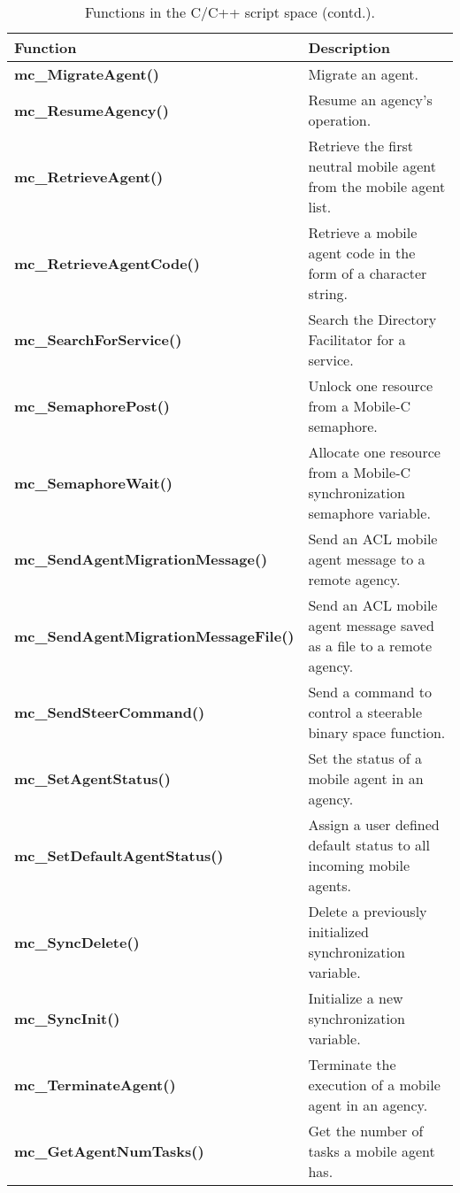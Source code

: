 \addtocounter{table}{-1} 
\begin{table}[!h]
\capstart
\begin{center}
\caption{Functions in the C/C++ script space (contd.).}
\begin{tabular}{p{63 mm}p{97 mm}}
\hline
Function & Description \\
\hline
{\bf mc\_MigrateAgent()} \dotfill  &  Migrate an agent. \\
{\bf mc\_ResumeAgency()} \dotfill  &   Resume an agency's operation. \\
{\bf mc\_RetrieveAgent()} \dotfill  &  Retrieve the first neutral mobile agent from the mobile agent list. \\
{\bf mc\_RetrieveAgentCode()} \dotfill  &  Retrieve a mobile agent code in the form of a character string. \\
{\bf mc\_SearchForService()} \dotfill  &  Search the Directory Facilitator for a service. \\
{\bf mc\_SemaphorePost()} \dotfill  &  Unlock one resource from a Mobile-C semaphore. \\
{\bf mc\_SemaphoreWait()} \dotfill  &  Allocate one resource from a Mobile-C synchronization semaphore variable. \\
{\bf mc\_SendAgentMigrationMessage()} \dotfill  &  Send an ACL mobile agent message to a remote agency. \\
{\bf mc\_SendAgentMigrationMessageFile()} \dotfill  &  Send an ACL mobile agent message saved as a file to a remote agency. \\
{\bf mc\_SendSteerCommand()} \dotfill  &  Send a command to control a steerable binary space function. \\
{\bf mc\_SetAgentStatus()} \dotfill  &  Set the status of a mobile agent in an agency. \\
{\bf mc\_SetDefaultAgentStatus()} \dotfill  &  Assign a user defined default status to all incoming mobile agents. \\
{\bf mc\_SyncDelete()} \dotfill  &  Delete a previously initialized synchronization variable. \\
{\bf mc\_SyncInit()} \dotfill  &  Initialize a new synchronization variable. \\
{\bf mc\_TerminateAgent()} \dotfill  &  Terminate the execution of a mobile agent in an agency. \\
{\bf mc\_GetAgentNumTasks()} \dotfill  &  Get the number of tasks a mobile agent has. \\

\end{tabular}
\end{center}
\end{table}
